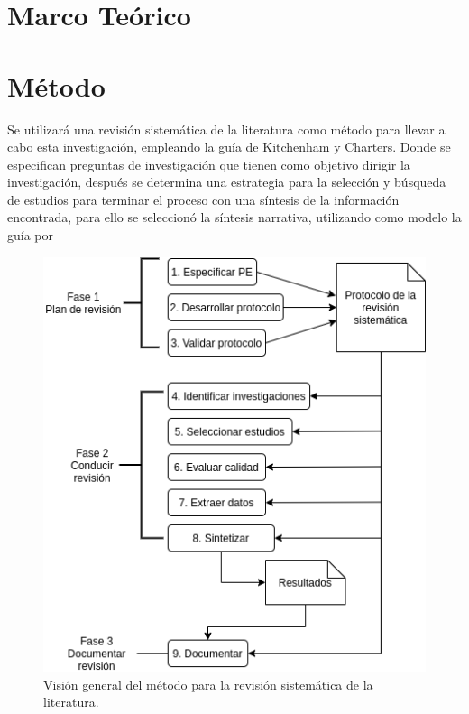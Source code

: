 \documentclass{article}
\begin{document}
\newpage

\section{Marco Teórico}
\newpage

\section{Método}
Se utilizará una revisión sistemática de la literatura como método para llevar a cabo esta investigación, 
empleando la guía de Kitchenham y Charters. Donde se especifican preguntas de investigación que tienen 
como objetivo dirigir la investigación, después se determina una estrategia para la selección y búsqueda de estudios para 
terminar el proceso con una síntesis de la información encontrada, para ello se seleccionó la síntesis narrativa, utilizando como 
modelo la guía por \cite{sintesisnarrativa} 

\begin{figure}[!htb]
   \includegraphics[width=\linewidth]{metodo.png}
   \caption{Visión general del método para la revisión sistemática de la literatura.}
   \label{fig:etapasconducción}
\end{figure}
\end{document}
